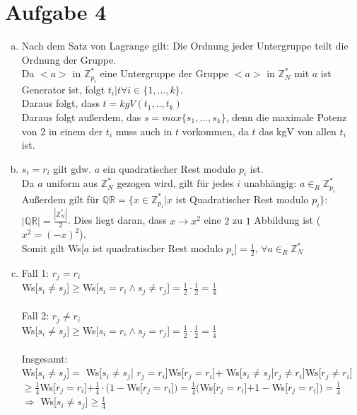 \documentclass[a4paper]{scrartcl}
\begin{document}
\section*{Aufgabe 4}
\begin{enumerate}[a)]
\item Nach dem Satz von Lagrange gilt: Die Ordnung jeder Untergruppe teilt die Ordnung der Gruppe.\\
Da $<a>$ in $\mathbb{Z}_{p_i}^*$ eine Untergruppe der Gruppe $<a>$ in $\mathbb{Z}_N^*$ mit $a$ ist Generator ist, folgt $t_i | t \forall i \in \{1, ..., k\}$.\\
Daraus folgt, dass $t = kgV(t_1,..,t_k)$\\
Daraus folgt außerdem, das $s=max\{s_1, ..., s_k\}$, denn die maximale Potenz von 2 in einem der $t_i$ muss auch in $t$ vorkommen, da $t$ das kgV von allen $t_i$ ist.


\item $s_i = r_i$ gilt gdw. $a$ ein quadratischer Rest modulo $p_i$ ist.\\
 Da $a$ uniform aus $\mathbb{Z}_N^*$ gezogen wird, gilt für jedes $i$ unabhängig: $a\in_R\mathbb{Z}_{p_i}^*$\\
Außerdem gilt für $\mathbb{QR}=\{x\in \mathbb{Z}_{p_i}^*|x$ ist Quadratischer Rest modulo $p_i\}$: $|\mathbb{QR}|=\frac{|\mathbb{Z}_N^*|}{2}$. Dies liegt daran, dass $x \rightarrow x^2$ eine $2$ zu $1$ Abbildung ist ($x^2=(-x)^2$).\\
Somit gilt Ws[$a$ ist quadratischer Rest modulo $p_i$]$=\frac{1}{2}$, $\forall a\in_R\mathbb{Z}_N^*$

\item Fall 1: $r_j=r_i$\\
Ws[$s_i\neq s_j$]$\geq$Ws[$s_i = r_i \wedge s_j \neq r_j$]$=\frac{1}{2}\cdot \frac{1}{2}= \frac{1}{4}$\\\\

Fall 2: $r_j \neq r_i$\\
Ws[$s_i\neq s_j$]$\geq$Ws[$s_i = r_i \wedge s_j = r_j$]$=\frac{1}{2}\cdot \frac{1}{2}=\frac{1}{4}$\\\\

Insgesamt:\\
Ws[$s_i \neq s_j$]$=$ Ws[$s_i \neq s_j$| $r_j=r_i$]Ws[$r_j=r_i$]+  Ws[$s_i \neq s_j$|$r_j \neq r_i$]Ws[$r_j \neq r_i$]$ \geq\frac{1}{4}$Ws[$r_j=r_i$]$+ \frac{1}{4}\cdot (1-$Ws[$r_j=r_i$]$)=\frac{1}{4}($Ws[$r_j=r_i$]$+1-$Ws[$r_j=r_i$]$)=\frac{1}{4}$\\
$\Rightarrow$ Ws[$s_i \neq s_j$]$\geq \frac{1}{4}$


\end{enumerate}
\end{document}
